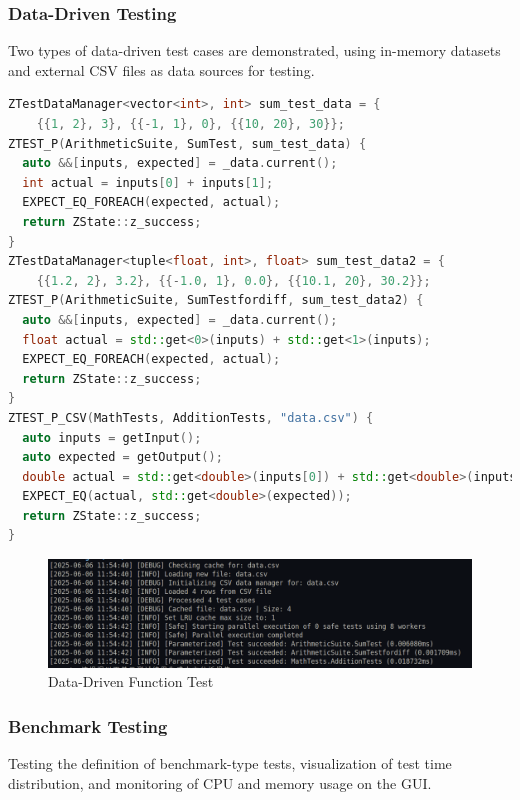 \documentclass{article}
\begin{document}
\subsubsection{Data-Driven Testing}
Two types of data-driven test cases are demonstrated, using in-memory datasets and external CSV files as data sources for testing.

\begin{framed}
    \begin{lstlisting}[language=C++]
ZTestDataManager<vector<int>, int> sum_test_data = {
    {{1, 2}, 3}, {{-1, 1}, 0}, {{10, 20}, 30}};
ZTEST_P(ArithmeticSuite, SumTest, sum_test_data) {
  auto &&[inputs, expected] = _data.current();
  int actual = inputs[0] + inputs[1];
  EXPECT_EQ_FOREACH(expected, actual);
  return ZState::z_success;
}
ZTestDataManager<tuple<float, int>, float> sum_test_data2 = {
    {{1.2, 2}, 3.2}, {{-1.0, 1}, 0.0}, {{10.1, 20}, 30.2}};
ZTEST_P(ArithmeticSuite, SumTestfordiff, sum_test_data2) {
  auto &&[inputs, expected] = _data.current();
  float actual = std::get<0>(inputs) + std::get<1>(inputs);
  EXPECT_EQ_FOREACH(expected, actual);
  return ZState::z_success;
}
ZTEST_P_CSV(MathTests, AdditionTests, "data.csv") {
  auto inputs = getInput();
  auto expected = getOutput();
  double actual = std::get<double>(inputs[0]) + std::get<double>(inputs[1]);
  EXPECT_EQ(actual, std::get<double>(expected));
  return ZState::z_success;
}
\end{lstlisting}
\end{framed}
\begin{figure}[H]
    \centering
    \includegraphics[width=\textwidth]{img/data.png}
    \caption{Data-Driven Function Test}
    \label{fig: Data-Driven Function Test}
\end{figure}
\subsubsection{Benchmark Testing}
Testing the definition of benchmark-type tests, visualization of test time distribution, and monitoring of CPU and memory usage on the GUI.
\end{document}
